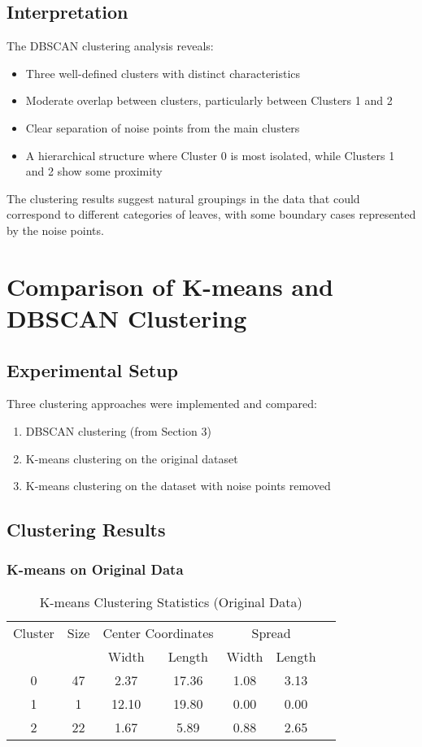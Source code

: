\documentclass[12pt]{article}
\begin{document}
\subsection{Interpretation}
The DBSCAN clustering analysis reveals:
\begin{itemize}
    \item Three well-defined clusters with distinct characteristics
    \item Moderate overlap between clusters, particularly between Clusters 1 and 2
    \item Clear separation of noise points from the main clusters
    \item A hierarchical structure where Cluster 0 is most isolated, while Clusters 1 and 2 show some proximity
\end{itemize}

The clustering results suggest natural groupings in the data that could correspond to different categories of leaves, with some boundary cases represented by the noise points.

\section{Comparison of K-means and DBSCAN Clustering}

\subsection{Experimental Setup}
Three clustering approaches were implemented and compared:
\begin{enumerate}
    \item DBSCAN clustering (from Section 3)
    \item K-means clustering on the original dataset
    \item K-means clustering on the dataset with noise points removed
\end{enumerate}

\subsection{Clustering Results}

\subsubsection{K-means on Original Data}
\begin{table}[H]
\centering
\begin{tabular}{ccccccc}
\toprule
Cluster & Size & \multicolumn{2}{c}{Center Coordinates} & \multicolumn{2}{c}{Spread} \\
\cmidrule(lr){3-4} \cmidrule(lr){5-6}
& & Width & Length & Width & Length \\
\midrule
0 & 47 & 2.37 & 17.36 & 1.08 & 3.13 \\
1 & 1 & 12.10 & 19.80 & 0.00 & 0.00 \\
2 & 22 & 1.67 & 5.89 & 0.88 & 2.65 \\
\bottomrule
\end{tabular}
\caption{K-means Clustering Statistics (Original Data)}
\end{table}
\end{document}
